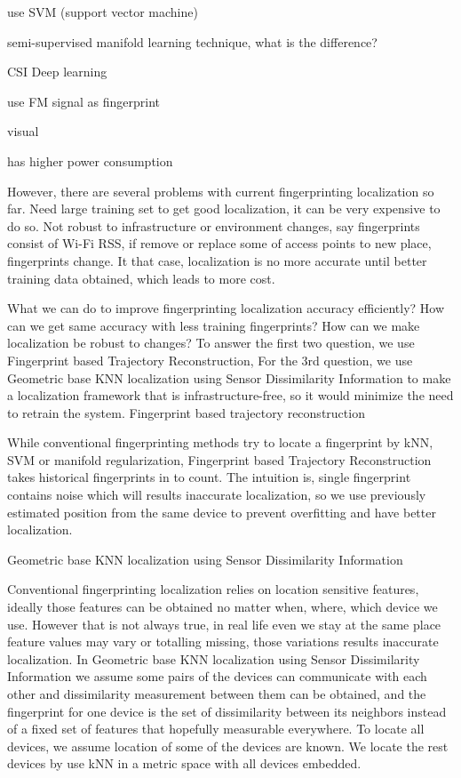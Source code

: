 \cite{brunato2005statistical} use SVM (support vector machine)

\cite{pulkkinen2011semi}semi-supervised manifold learning technique, what is the difference? 

CSI Deep learning

\cite{chen2012fm} use FM signal as fingerprint

visual

has higher power consumption

However, there are several problems with current fingerprinting localization so far. Need large training set to get good localization, it can be very expensive to do so. Not robust to infrastructure or environment changes, say fingerprints consist of Wi-Fi RSS, if remove or replace some of access points to new place, fingerprints change. It that case, localization is no more accurate until better training data obtained, which leads to more cost.

What we can do to improve fingerprinting localization accuracy efficiently? How can we get same accuracy with less training fingerprints? How can we make localization be robust to changes? To answer the first two question, we use Fingerprint based Trajectory Reconstruction, For the 3rd question, we use Geometric base KNN localization using Sensor Dissimilarity Information to make a localization framework that is infrastructure-free, so it would minimize the need to retrain the system.
Fingerprint based trajectory reconstruction

While conventional fingerprinting methods try to locate a fingerprint by kNN, SVM or manifold regularization, Fingerprint based Trajectory Reconstruction takes historical fingerprints in to count. The intuition is, single fingerprint contains noise which will results inaccurate localization, so we use previously estimated position from the same device to prevent overfitting and have better localization.
 
Geometric base KNN localization using Sensor Dissimilarity Information

Conventional fingerprinting localization relies on location sensitive features, ideally those features can be obtained no matter when, where, which device we use. However that is not always true, in real life even we stay at the same place feature values may vary or totalling missing, those variations results inaccurate localization. In Geometric base KNN localization using Sensor Dissimilarity Information we assume some pairs of the devices can communicate with each other and dissimilarity measurement between them can be obtained, and the fingerprint for one device is the set of dissimilarity between its neighbors instead of a fixed set of features that hopefully measurable everywhere. To locate all devices, we assume location of some of the devices are known. We locate the rest devices by use kNN in a metric space with all devices embedded.
